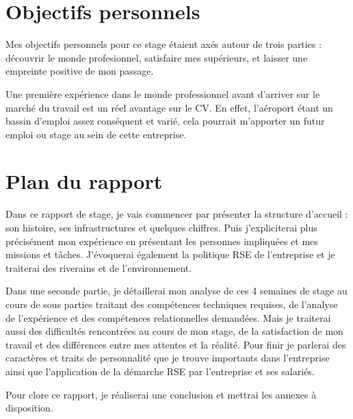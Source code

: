\section{Objectifs personnels}

Mes objectifs personnels pour ce stage étaient axés autour de trois parties : découvrir le monde profesionnel, satisfaire mes supérieurs, et laisser une empreinte positive de mon passage.


Une première expérience dans le monde professionnel avant d’arriver sur le marché du travail est un réel avantage sur le CV. En effet, l’aéroport étant un bassin d’emploi assez conséquent et varié, cela pourrait m’apporter un futur emploi ou stage au sein de cette entreprise.



\section{Plan du rapport}

Dans ce rapport de stage, je vais commencer par présenter la structure d'accueil : son histoire, ses infrastructures et quelques chiffres. Puis j'expliciterai plus précisément mon expérience en présentant les personnes impliquées et mes missions et tâches. J'évoquerai également la politique RSE de l'entreprise et je traiterai des riverains et de l'environnement.

Dans une seconde partie, je détaillerai mon analyse de ces 4 semaines de stage au cours de sous parties traitant des compétences techniques requises, de l'analyse de l'expérience et des compétences relationnelles demandées. Mais je traiterai aussi des difficultés rencontrées au cours de mon stage, de la satisfaction de mon travail et des différences entre mes attentes et la réalité. Pour finir je parlerai des caractères et traits de personnalité que je trouve importants dans l'entreprise ainsi que l'application de la démarche RSE par l'entreprise et ses salariés.

Pour clore ce rapport, je réaliserai une conclusion et mettrai les annexes à disposition.